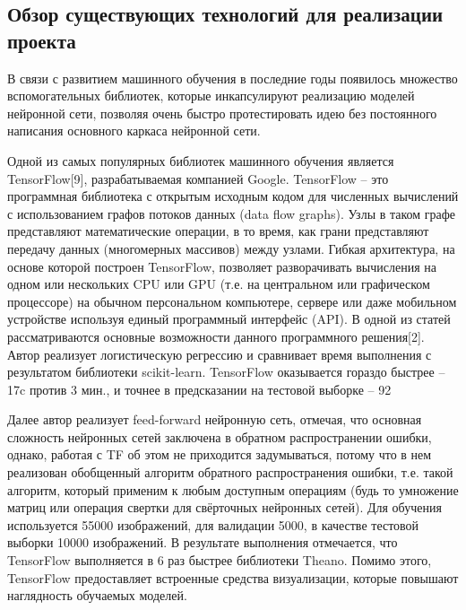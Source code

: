 \begin{Large}
\subsection{Обзор существующих технологий для реализации проекта}
В связи с развитием машинного обучения в последние годы появилось множество вспомогательных библиотек, которые инкапсулируют реализацию моделей нейронной сети, позволяя очень быстро протестировать идею без постоянного написания основного каркаса нейронной сети.

Одной из самых популярных библиотек машинного обучения является TensorFlow[9], разрабатываемая компанией Google. TensorFlow – это программная библиотека с открытым исходным кодом для численных вычислений с использованием графов потоков данных (data flow graphs). Узлы в таком графе представляют математические операции, в то время, как грани представляют передачу данных (многомерных массивов) между узлами. Гибкая архитектура, на основе которой построен TensorFlow, позволяет разворачивать вычисления на одном или нескольких CPU или GPU (т.е. на центральном или графическом процессоре) на обычном персональном компьютере, сервере или даже мобильном устройстве используя единый программный интерфейс (API).  В одной из статей рассматриваются основные возможности данного программного решения[2]. Автор реализует логистическую регрессию и сравнивает время выполнения с результатом библиотеки scikit-learn. TensorFlow оказывается гораздо быстрее – 17c против 3 мин., и точнее в предсказании на тестовой выборке – 92%

Далее автор реализует feed-forward нейронную сеть, отмечая, что основная сложность нейронных сетей заключена в обратном распространении ошибки, однако, работая с TF об этом не приходится задумываться, потому что в нем реализован обобщенный алгоритм обратного распространения ошибки, т.е. такой алгоритм, который применим к любым доступным операциям (будь то умножение матриц или операция свертки для свёрточных нейронных сетей). Для обучения используется 55000 изображений, для валидации 5000, в качестве тестовой выборки 10000 изображений. В результате выполнения отмечается, что TensorFlow выполняется в 6 раз быстрее библиотеки Theano. Помимо этого, TensorFlow предоставляет встроенные средства визуализации, которые повышают наглядность обучаемых моделей.


\end{Large}
